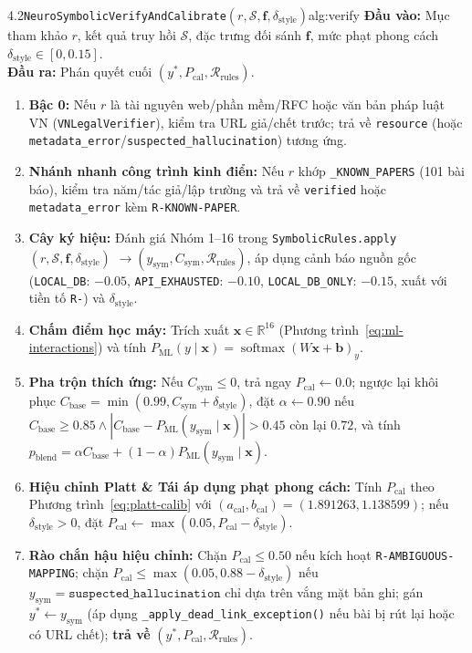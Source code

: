 \begin{citraalgo}{4.2}{\texttt{NeuroSymbolicVerifyAndCalibrate}$(r, \mathcal{S}, \mathbf{f}, \delta_{\text{style}})$}{alg:verify}
\textbf{Đầu vào:} Mục tham khảo $r$, kết quả truy hồi $\mathcal{S}$, đặc trưng đối sánh $\mathbf{f}$, mức phạt phong cách $\delta_{\text{style}} \in [0, 0.15]$.\\
\textbf{Đầu ra:} Phán quyết cuối $(y^*, P_{\text{cal}}, \mathcal{R}_{\text{rules}})$.
{\setlength{\leftmargini}{1.6em}
\begin{enumerate}\setlength{\itemsep}{1pt}\setlength{\parskip}{0pt}
\item \textbf{Bậc 0:} Nếu $r$ là tài nguyên web/phần mềm/RFC hoặc văn bản pháp luật VN (\texttt{VNLegalVerifier}), kiểm tra URL giả/chết trước; trả về \texttt{resource} (hoặc \texttt{metadata\_error}/\texttt{suspected\_hallucination}) tương ứng.
\item \textbf{Nhánh nhanh công trình kinh điển:} Nếu $r$ khớp \texttt{\_KNOWN\_PAPERS} (101 bài báo), kiểm tra năm/tác giả/lập trường và trả về \texttt{verified} hoặc \texttt{metadata\_error} kèm \texttt{R-KNOWN-PAPER}.
\item \textbf{Cây ký hiệu:} Đánh giá Nhóm 1--16 trong \texttt{SymbolicRules.apply}$(r, \mathcal{S}, \mathbf{f}, \delta_{\text{style}})$ $\rightarrow (y_{\text{sym}}, C_{\text{sym}}, \mathcal{R}_{\text{rules}})$, áp dụng cảnh báo nguồn gốc (\texttt{LOCAL\_DB}: $-0.05$, \texttt{API\_EXHAUSTED}: $-0.10$, \texttt{LOCAL\_DB\_ONLY}: $-0.15$, xuất với tiền tố \texttt{R-}) và $\delta_{\text{style}}$.
\item \textbf{Chấm điểm học máy:} Trích xuất $\mathbf{x} \in \mathbb{R}^{16}$ (Phương trình~\eqref{eq:ml-interactions}) và tính $P_{\text{ML}}(y \mid \mathbf{x}) = \operatorname{softmax}(W\mathbf{x} + \mathbf{b})_y$.
\item \textbf{Pha trộn thích ứng:} Nếu $C_{\text{sym}} \le 0$, trả ngay $P_{\text{cal}} \leftarrow 0.0$; ngược lại khôi phục $C_{\text{base}} = \min(0.99, C_{\text{sym}} + \delta_{\text{style}})$, đặt $\alpha \leftarrow 0.90$ nếu $C_{\text{base}} \ge 0.85 \land |C_{\text{base}} - P_{\text{ML}}(y_{\text{sym}} \mid \mathbf{x})| > 0.45$ còn lại $0.72$, và tính $p_{\text{blend}} = \alpha C_{\text{base}} + (1 - \alpha) P_{\text{ML}}(y_{\text{sym}} \mid \mathbf{x})$.
\item \textbf{Hiệu chỉnh Platt \& Tái áp dụng phạt phong cách:} Tính $P_{\text{cal}}$ theo Phương trình~\eqref{eq:platt-calib} với $(a_{\text{cal}}, b_{\text{cal}}) = (1.891263, 1.138599)$; nếu $\delta_{\text{style}} > 0$, đặt $P_{\text{cal}} \leftarrow \max(0.05, P_{\text{cal}} - \delta_{\text{style}})$.
\item \textbf{Rào chắn hậu hiệu chỉnh:} Chặn $P_{\text{cal}} \le 0.50$ nếu kích hoạt \texttt{R-AMBIGUOUS-MAPPING}; chặn $P_{\text{cal}} \le \max(0.05, 0.88 - \delta_{\text{style}})$ nếu $y_{\text{sym}} = \texttt{suspected\_hallucination}$ chỉ dựa trên vắng mặt bản ghi; gán $y^* \leftarrow y_{\text{sym}}$ (áp dụng \texttt{\_apply\_dead\_link\_exception()} nếu bài bị rút lại hoặc có URL chết); \textbf{trả về} $(y^*, P_{\text{cal}}, \mathcal{R}_{\text{rules}})$.
\end{enumerate}}
\end{citraalgo}

